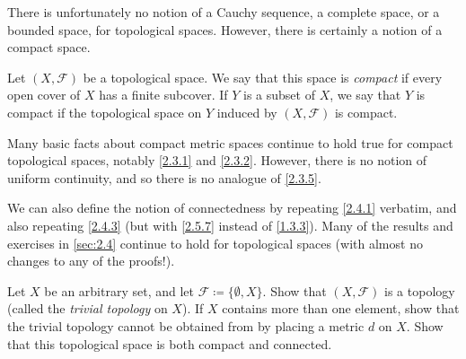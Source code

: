 \begin{note}
  There is unfortunately no notion of a Cauchy sequence, a complete space, or a bounded space, for topological spaces.
  However, there is certainly a notion of a compact space.
\end{note}

\begin{defn}\label{2.5.9}
  Let \((X, \mathcal{F})\) be a topological space.
  We say that this space is \emph{compact} if every open cover of \(X\) has a finite subcover.
  If \(Y\) is a subset of \(X\), we say that \(Y\) is compact if the topological space on \(Y\) induced by \((X, \mathcal{F})\) is compact.
\end{defn}

\begin{note}
  Many basic facts about compact metric spaces continue to hold true for compact topological spaces, notably \cref{2.3.1} and \cref{2.3.2}.
  However, there is no notion of uniform continuity, and so there is no analogue of \cref{2.3.5}.
\end{note}

\begin{note}
  We can also define the notion of connectedness by repeating \cref{2.4.1} verbatim, and also repeating \cref{2.4.3} (but with \cref{2.5.7} instead of \cref{1.3.3}).
  Many of the results and exercises in \cref{sec:2.4} continue to hold for topological spaces
  (with almost no changes to any of the proofs!).
\end{note}

\exercisesection

\begin{ex}\label{ex:2.5.1}
  Let \(X\) be an arbitrary set, and let \(\mathcal{F} \coloneqq \{\emptyset, X\}\).
  Show that \((X, \mathcal{F})\) is a topology
  (called the \emph{trivial topology} on \(X\)).
  If \(X\) contains more than one element, show that the trivial topology cannot be obtained from by placing a metric \(d\) on \(X\).
  Show that this topological space is both compact and connected.
\end{ex}

